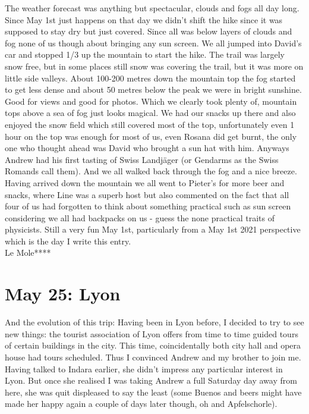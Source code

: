 The weather forecast was anything but spectacular, clouds and fogs all day long. Since May 1st just happens on that day we didn't shift the hike since it was supposed to stay dry but just covered. Since all was below layers of clouds and fog none of us though about bringing any sun screen. We all jumped into David's car and stopped 1/3 up the mountain to start the hike. The trail was largely snow free, but in some places still snow was covering the trail, but it was more on little side valleys. About 100-200 metres down the mountain top the fog started to get less dense and about 50 metres below the peak we were in bright sunshine. Good for views and good for photos. Which we clearly took plenty of, mountain tops above a sea of fog just looks magical. We had our snacks up there and also enjoyed the snow field which still covered most of the top, unfortunately even 1 hour on the top was enough for most of us, even Rosana did get burnt, the only one who thought ahead was David who brought a sun hat with him. Anyways Andrew had his first tasting of Swiss Landj\"ager (or Gendarms as the Swiss Romands call them). And we all walked back through the fog and a nice breeze. \\
Having arrived down the mountain we all went to Pieter's for more beer and snacks, where Line was a superb host but also commented on the fact that all four of us had forgotten to think about something practical such as sun screen considering we all had backpacks on us - guess the none practical traits of physicists. Still a very fun May 1st, particularly from a May 1st 2021 perspective which is the day I write this entry.\\

Le Mole****

\section{May 25: Lyon}
\label{Lyon2013}

And the evolution of this trip: Having been in Lyon before, I decided to try to see new things: the tourist association of Lyon offers from time to time guided tours of certain buildings in the city. This time, coincidentally both city hall and opera house had tours scheduled. Thus I convinced Andrew and my brother to join me. Having talked to Indara earlier, she didn't impress any particular interest in Lyon. But once she realised I was taking Andrew a full Saturday day away from here, she was quit displeased to say the least (some Buenos and beers might have made her happy again a couple of days later though, oh and Apfelschorle).\\

